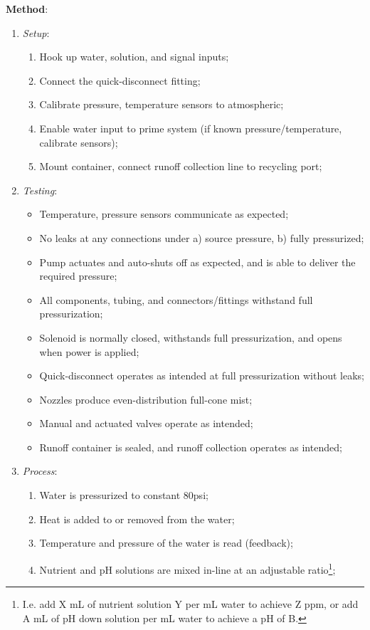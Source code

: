 \textbf{Method}:
\begin{enumerate}
    \item \textit{Setup}:
    \begin{enumerate}
        \item Hook up water, solution, and signal inputs;
        \item Connect the quick-disconnect fitting;
        \item Calibrate pressure, temperature sensors to atmospheric;
        \item Enable water input to prime system (if known pressure/temperature, calibrate sensors);
        \item Mount container, connect runoff collection line to recycling port;
    \end{enumerate}
    \item \textit{Testing}:
    \begin{itemize}
        \item Temperature, pressure sensors communicate as expected;
        \item No leaks at any connections under a) source pressure, b) fully pressurized;
        \item Pump actuates and auto-shuts off as expected, and is able to deliver the required pressure;
        \item All components, tubing, and connectors/fittings withstand full pressurization;
        \item Solenoid is normally closed, withstands full pressurization, and opens when power is applied;
        \item Quick-disconnect operates as intended at full pressurization without leaks;
        \item Nozzles produce even-distribution full-cone mist;
        \item Manual and actuated valves operate as intended;
        \item Runoff container is sealed, and runoff collection operates as intended;
    \end{itemize}
    \item \textit{Process}:
    \begin{enumerate}
        \item Water is pressurized to constant 80psi;
        \item Heat is added to or removed from the water;
        \item Temperature and pressure of the water is read (feedback);
        \item Nutrient and pH solutions are mixed in-line at an adjustable ratio\footnote{I.e. add X mL of nutrient solution Y per mL water to achieve Z ppm, or add A mL of pH down solution per mL water to achieve a pH of B.};

\end{enumerate}
\end{enumerate}
